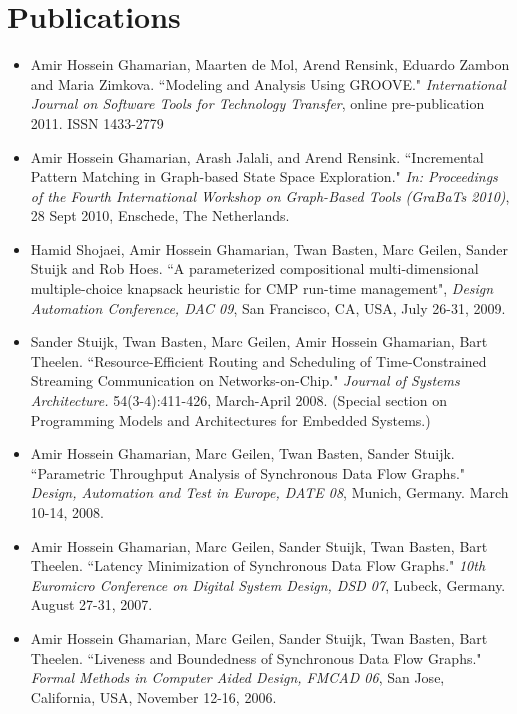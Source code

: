 \section{Publications}
\begin{itemize}
\item Amir Hossein Ghamarian, Maarten de Mol, Arend Rensink, Eduardo
Zambon and Maria Zimkova. ``Modeling and Analysis Using GROOVE." \emph{
International Journal on Software Tools for Technology Transfer},
online pre-publication 2011. ISSN 1433-2779

\item Amir Hossein Ghamarian, Arash Jalali, and Arend Rensink. ``Incremental
Pattern Matching in Graph-based State Space Exploration." \emph{In: Proceedings of the Fourth
International Workshop on Graph-Based Tools (GraBaTs 2010)}, 28 Sept 2010, Enschede, The Netherlands.

\item Hamid Shojaei, Amir Hossein Ghamarian, Twan Basten, Marc Geilen, Sander Stuijk and Rob Hoes.
``A parameterized compositional multi-dimensional multiple-choice knapsack heuristic for CMP run-time management",
\emph{Design Automation Conference, DAC 09}, San Francisco, CA, USA, July 26-31, 2009.

\item Sander Stuijk, Twan
Basten, Marc Geilen, Amir Hossein Ghamarian, Bart Theelen.
``Resource-Efficient Routing and Scheduling of Time-Constrained
Streaming Communication on Networks-on-Chip." \emph{Journal of
Systems Architecture.} 54(3-4):411-426, March-April 2008. (Special
section on Programming Models and Architectures for Embedded
Systems.)

\item Amir Hossein Ghamarian, Marc Geilen, Twan
Basten, Sander Stuijk. ``Parametric Throughput Analysis of
Synchronous Data Flow Graphs." \emph{Design, Automation and Test in
Europe, DATE 08}, Munich, Germany. March 10-14, 2008.

\item Amir Hossein Ghamarian, Marc Geilen, Sander Stuijk, Twan
Basten, Bart Theelen. ``Latency Minimization of Synchronous Data
Flow Graphs." \emph{10th Euromicro Conference on
Digital System Design, DSD 07}, Lubeck, Germany. August 27-31, 2007.

\item Amir Hossein Ghamarian, Marc Geilen, Sander Stuijk, Twan
Basten, Bart Theelen. ``Liveness and Boundedness of Synchronous Data
Flow Graphs." \emph{Formal Methods in Computer Aided Design, FMCAD
06}, San Jose, California, USA, November 12-16, 2006.


\end{itemize}
